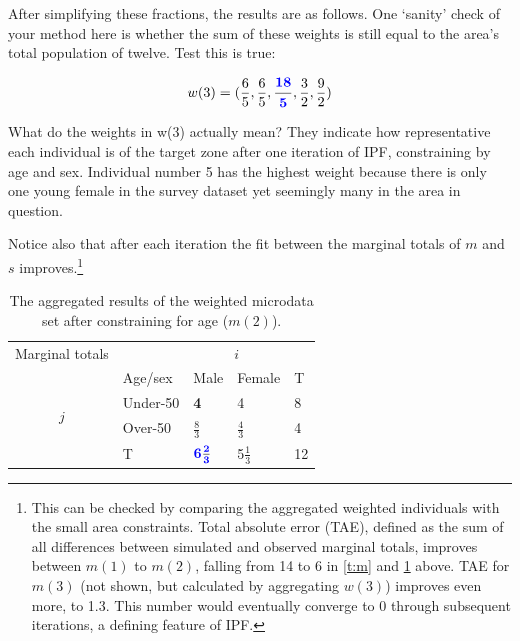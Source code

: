 \documentclass[a4paper, 11pt, twoside]{article}
\begin{document}
After simplifying these fractions, the results are as follows.
One `sanity' check of your method here is whether the sum of these
weights is still equal to the area's total population of twelve. Test this is
true:

\begin{equation}
w(3) = (\frac{6}{5}, \frac{6}{5}, \boldsymbol{\frac{\color{blue}18}{\color{blue}5}}, \frac{3}{2},
\frac{9}{2})
\label{finalout}
\end{equation}

What do the weights in w(3) actually mean? They indicate how representative
each individual is of the target zone after one iteration of IPF, constraining
by age and sex. Individual number 5 has the highest weight because there is
only one young female in the survey dataset yet seemingly many in the area in
question.

Notice also that after each iteration the fit between the marginal
totals of $m$ and $s$
improves.\footnote{This can be checked by comparing the aggregated weighted
individuals with the small area constraints. Total absolute error (TAE),
defined as the sum of all differences between simulated and observed marginal
totals, improves between $m(1)$ to $m(2)$, falling from
14 to 6 in \cref{t:m} and \cref{t:m2} above. TAE for $m(3)$ (not shown,
but calculated by aggregating $w(3)$) improves even more, to 1.3.
This number would eventually converge to 0 through subsequent
iterations, a defining feature of IPF.}


\begin{table}[htbp]
\centering
\caption[Aggregated results after constraining for age]{The
aggregated results of the weighted
microdata set after constraining for age ($m(2)$).
}

\begin{tabular}{cllll}\toprule
Marginal totals&  & \multicolumn{2}{c}{$i$} & \\
& Age/sex & Male & Female & T\\ \midrule
\multirow{2}{*}{$j$} & Under-50 & \textbf{\color{blue}4} & 4 & 8\\
& Over-50 & $\frac{8}{3}$ & $\frac{4}{3}$ & 4 \\
& T & $\boldsymbol{{\color{blue}6}\frac{\color{blue}2}{\color{blue}3}}$ & 5$\frac{1}{3}$ & 12\\
\bottomrule
\end{tabular}
\label{t:m2}
\end{table}
\end{document}
